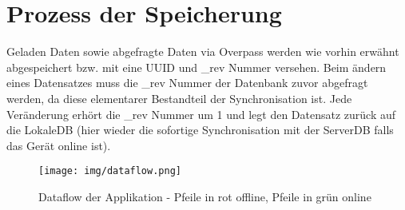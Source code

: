 \section{Prozess der Speicherung}
\label{sec:speicherung}
Geladen Daten sowie abgefragte Daten via Overpass werden wie vorhin erwähnt abgespeichert bzw. mit eine UUID und _rev Nummer versehen. Beim ändern eines Datensatzes muss die _rev Nummer der Datenbank zuvor abgefragt werden, da diese elementarer Bestandteil der Synchronisation ist. Jede Veränderung erhört die _rev Nummer um 1 und legt den Datensatz zurück auf die LokaleDB (hier wieder die sofortige Synchronisation mit der ServerDB falls das Gerät online ist).


\begin{figure}[H]
  \centering  
  \texttt{[image: img/dataflow.png]}
  \caption{Dataflow der Applikation - Pfeile in rot offline, Pfeile in grün online}
  \label{fig:mapping}
\end{figure}
